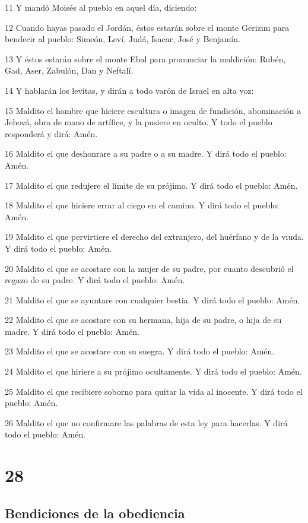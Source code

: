 \par 11 Y mandó Moisés al pueblo en aquel día, diciendo:
\par 12 Cuando hayas pasado el Jordán, éstos estarán sobre el monte Gerizim para bendecir al pueblo: Simeón, Leví, Judá, Isacar, José y Benjamín.
\par 13 Y éstos estarán sobre el monte Ebal para pronunciar la maldición: Rubén, Gad, Aser, Zabulón, Dan y Neftalí.
\par 14 Y hablarán los levitas, y dirán a todo varón de Israel en alta voz:
\par 15 Maldito el hombre que hiciere escultura o imagen de fundición, abominación a Jehová, obra de mano de artífice, y la pusiere en oculto. Y todo el pueblo responderá y dirá: Amén.
\par 16 Maldito el que deshonrare a su padre o a su madre. Y dirá todo el pueblo: Amén.
\par 17 Maldito el que redujere el límite de su prójimo. Y dirá todo el pueblo: Amén.
\par 18 Maldito el que hiciere errar al ciego en el camino. Y dirá todo el pueblo: Amén. 
\par 19 Maldito el que pervirtiere el derecho del extranjero, del huérfano y de la viuda. Y dirá todo el pueblo: Amén.
\par 20 Maldito el que se acostare con la mujer de su padre, por cuanto descubrió el regazo de su padre. Y dirá todo el pueblo: Amén.
\par 21 Maldito el que se ayuntare con cualquier bestia. Y dirá todo el pueblo: Amén.
\par 22 Maldito el que se acostare con su hermana, hija de su padre, o hija de su madre. Y dirá todo el pueblo: Amén.
\par 23 Maldito el que se acostare con su suegra. Y dirá todo el pueblo: Amén.
\par 24 Maldito el que hiriere a su prójimo ocultamente. Y dirá todo el pueblo: Amén.
\par 25 Maldito el que recibiere soborno para quitar la vida al inocente. Y dirá todo el pueblo: Amén.
\par 26 Maldito el que no confirmare las palabras de esta ley para hacerlas. Y dirá todo el pueblo: Amén.

\chapter{28}

\section{Bendiciones de la obediencia}

